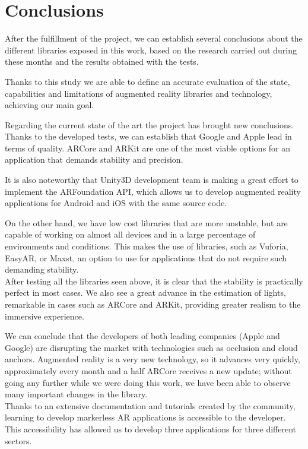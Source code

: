 \chapter*{Conclusions}

After the fulfillment of the project, we can establish several conclusions about the different libraries exposed in this work, based on the research carried out during these months and the results obtained with the tests.

Thanks to this study we are able to define an accurate evaluation of the state, capabilities and limitations of augmented reality libraries and technology, achieving our main goal.

Regarding the current state of the art the project has brought new conclusions.
Thanks to the developed tests, we can establish that Google and Apple lead in terms of quality. ARCore and ARKit are one of the most viable options for an application that demands stability and precision. 

It is also noteworthy that Unity3D development team is making a great effort to implement the ARFoundation API, which allows us to develop augmented reality applications for Android and iOS with the same source code.

On the other hand, we have low cost libraries that are more unstable, but are capable of working on almost all devices\cite{wikitudeInstant} and in a large percentage of environments and conditions. This makes the use of libraries, such as Vuforia, EasyAR, or Maxst, an option to use for applications that do not require such demanding stability. \\

After testing all the libraries seen above, it is clear that the stability is practically perfect in most cases. We also see a great advance in the estimation of lights, remarkable in cases such as ARCore and ARKit, providing greater realism to the immersive experience. 

We can conclude that the developers of both leading companies (Apple and Google) are disrupting the market with technologies such as occlusion and cloud anchors. Augmented reality is a very new technology, so it advances very quickly, approximately every month and a half ARCore receives a new update; without going any further while we were doing this work, we have been able to observe many important changes in the library. \\

Thanks to an extensive documentation and tutorials created by the community, learning to develop markerless AR applications is accessible to the developer. This accessibility has allowed us to develop three applications for three different sectors.

